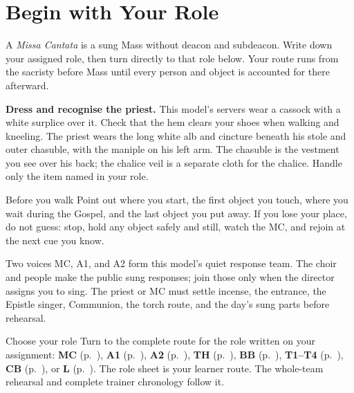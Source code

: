 \section{Begin with Your Role}

A \textit{Missa Cantata} is a sung Mass without deacon and subdeacon. Write
down your assigned role, then turn directly to that role below. Your route
runs from the sacristy before Mass until every person and object is accounted
for there afterward.

\noindent\textbf{Dress and recognise the priest.}
This model's servers wear a cassock with a white surplice over it. Check that
the hem clears your shoes when walking and kneeling. The priest wears the
long white alb and cincture beneath his stole and outer chasuble, with the
maniple on his left arm. The chasuble is the vestment you see over his back;
the chalice veil is a separate cloth for the chalice. Handle only the item
named in your role.

\begin{learnerbox}{Before you walk}
Point out where you start, the first object you touch, where you wait during
the Gospel, and the last object you put away. If you lose your place, do not
guess: stop, hold any object safely and still, watch the MC, and rejoin at the
next cue you know.
\end{learnerbox}

\begin{watchbox}{Two voices}
MC, A1, and A2 form this model's quiet response team. The choir and people
make the public sung responses; join those only when the director assigns you
to sing. The priest or MC must settle incense, the entrance, the Epistle
singer, Communion, the torch route, and the day's sung parts before rehearsal.
\end{watchbox}

\begin{learnerbox}{Choose your role}
Turn to the complete route for the role written on your assignment:
\textbf{MC} (p.~\pageref{mc-role:mc:first}),
\textbf{A1} (p.~\pageref{mc-role:a1:first}),
\textbf{A2} (p.~\pageref{mc-role:a2:first}),
\textbf{TH} (p.~\pageref{mc-role:th:first}),
\textbf{BB} (p.~\pageref{mc-role:bb:first}),
\textbf{T1--T4} (p.~\pageref{mc-role:t:first}),
\textbf{CB} (p.~\pageref{mc-role:cb:first}), or
\textbf{L} (p.~\pageref{mc-role:l:first}).
The role sheet is your learner route. The whole-team rehearsal and complete
trainer chronology follow it.
\end{learnerbox}

